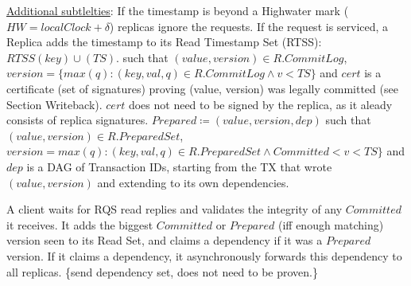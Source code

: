 \begin{enumerate}
\underline{Additional subtlelties}: If the timestamp is beyond a Highwater mark ($HW = localClock + \delta$) replicas ignore the requests. If the request is serviced, a Replica adds the timestamp to its Read Timestamp Set (RTSS): $RTSS(key) \cup (TS)$.  such that $ (value, version) \in R.CommitLog$, $version = \{max(q) : (key, val, q) \in R.CommitLog \land v < TS \}$ and $cert$ is a certificate (set of signatures) proving (value, version) was legally committed (see Section Writeback). $cert$ does not need to be signed by the replica, as it aleady consists of replica signatures.
 $Prepared \coloneqq (value, version, dep)$ such that $(value, version) \in R.PreparedSet$, $version = max(q) : (key, val, q) \in R.PreparedSet \land Committed < v < TS \}$ and $dep$ is a DAG of Transaction IDs, starting from the TX that wrote $(value, version)$ and extending to its own dependencies.





A client waits for RQS read replies and validates the integrity of any $Committed$ it receives.  It adds the biggest $Committed$ or $Prepared$ (iff enough matching) version seen to its Read Set, and claims a dependency if it was a $Prepared$ version. If it claims a dependency, it asynchronously forwards this dependency to all replicas. 
\{send dependency set, does not need to be proven.\}



\end{enumerate}
